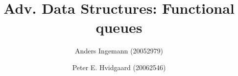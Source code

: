 \documentclass[12pt,a4paper]{report}
\title{Adv. Data Structures: Functional queues}
\author{Anders Ingemann (20052979) \and Peter E. Hvidgaard (20062546)}
\begin{document}
\maketitle
\newpage\mbox{}\newpage






\end{document}
